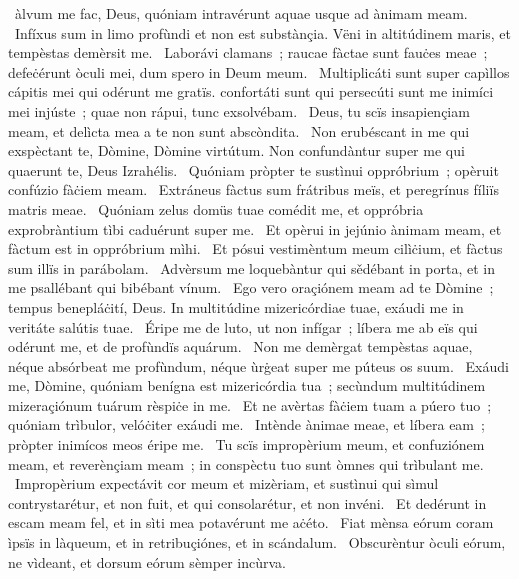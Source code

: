 \psalmChapterWithInscription{}
{ }
{%
~àlvum me fac, Deus, quóniam intravérunt aquae usque ad ànimam meam. 
~Infíxus sum in limo profùndi et non est substànçia. Vëni in altitúdinem maris, et tempèstas demèrsit me. 
~Laborávi clamans~; raucae fàctae sunt fauċes meae~; defeċérunt òculi mei, dum spero in Deum meum. 
~Multiplicáti sunt super capìllos cápitis mei qui odérunt me gratïs. confortáti sunt qui persecúti sunt me inimíci mei injúste~; quae non rápui, tunc exsolvébam. 
~Deus, tu scïs insapiençiam meam, et delìcta mea a te non sunt abscòndita. 
~Non erubéscant in me qui exspèctant te, Dòmine, Dòmine virtútum. Non confundàntur super me qui quaerunt te, Deus Izrahélis. 
~Quóniam pròpter te sustìnui oppróbrium~; opèruit confúzio fàċiem meam. 
~Extráneus fàctus sum frátribus meïs, et peregrínus fíliïs matris meae. 
~Quóniam zelus domüs tuae comédit me, et oppróbria exprobràntium tìbi caduérunt super me. 
~Et opèrui in jejúnio ànimam meam, et fàctum est in oppróbrium mìhi. 
~Et pósui vestimèntum meum cilìċium, et fàctus sum illïs in parábolam. 
~Advèrsum me loquebàntur qui sědébant in porta, et in me psallébant qui bibébant vínum. 
~Ego vero oraçiónem meam ad te Dòmine~; tempus benepláċití, Deus. In multitúdine mizericórdiae tuae, exáudi me in veritáte salútis tuae. 
~Éripe me de luto, ut non infígar~; líbera me ab eïs qui odérunt me, et de profùndïs aquárum. 
~Non me demèrgat tempèstas aquae, néque absórbeat me profùndum, néque ùrġeat super me púteus os suum. 
~Exáudi me, Dòmine, quóniam benígna est mizericórdia tua~; secùndum multitúdinem mizeraçiónum tuárum rèspiċe in me. 
~Et ne avèrtas fàċiem tuam a púero tuo~; quóniam trìbulor, velóċiter exáudi me. 
~Intènde ànimae meae, et líbera eam~; pròpter inimícos meos éripe me. 
~Tu scïs impropèrium meum, et confuziónem meam, et reverènçiam meam~; in conspèctu tuo sunt òmnes qui trìbulant me. 
~Impropèrium expectávit cor meum et mizèriam, et sustìnui qui sìmul contrystarétur, et non fuit, et qui consolarétur, et non invéni. 
~Et dedérunt in escam meam fel, et in sìti mea potavérunt me aċéto. 
~Fiat mènsa eórum coram ìpsïs in làqueum, et in retribuçiónes, et in scándalum. 
~Obscurèntur òculi eórum, ne vìdeant, et dorsum eórum sèmper incùrva. 
}

